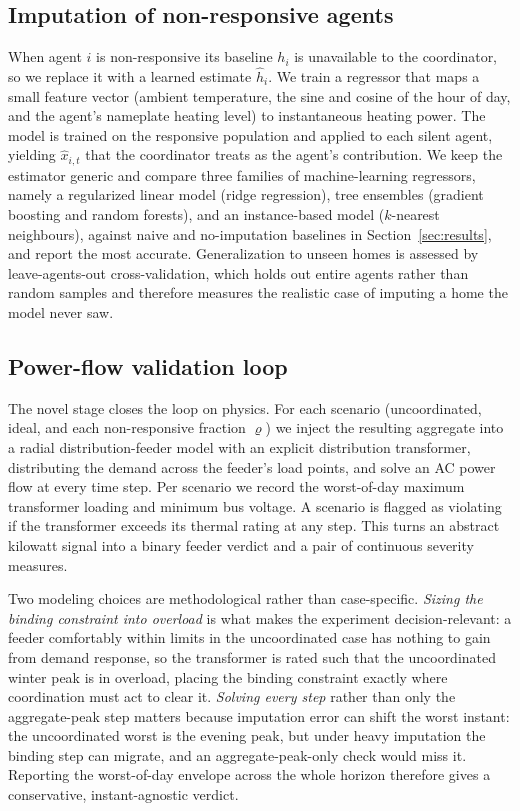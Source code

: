 \subsection{Imputation of non-responsive agents}
When agent $i$ is non-responsive its baseline $h_i$ is unavailable to the
coordinator, so we replace it with a learned estimate $\hat{h}_i$. We train a
regressor that maps a small feature vector (ambient temperature, the sine and
cosine of the hour of day, and the agent's nameplate heating level) to
instantaneous heating power. The model is trained on the responsive population
and applied to each silent agent, yielding $\hat{x}_{i,t}$ that the coordinator
treats as the agent's contribution. We keep the estimator generic and compare
three families of machine-learning regressors, namely a regularized linear model
(ridge regression), tree ensembles (gradient boosting \cite{ke2017lightgbm} and
random forests), and an instance-based model ($k$-nearest neighbours), against
naive and no-imputation baselines in Section~\ref{sec:results}, and report the
most accurate. Generalization to unseen homes is assessed
by leave-agents-out cross-validation, which holds out entire agents rather than
random samples and therefore measures the realistic case of imputing a home the
model never saw.

\subsection{Power-flow validation loop}
The novel stage closes the loop on physics. For each scenario (uncoordinated,
ideal, and each non-responsive fraction $\varrho$) we inject the resulting
aggregate into a radial distribution-feeder model with an explicit distribution
transformer, distributing the demand across the feeder's load points, and solve
an AC power flow at every time step. Per scenario we record the worst-of-day
maximum transformer loading and minimum bus voltage. A scenario is flagged as
violating if the transformer exceeds its thermal rating at any step. This turns
an abstract kilowatt signal into a binary feeder verdict and a pair of continuous
severity measures.

Two modeling choices are methodological rather than case-specific. \emph{Sizing
the binding constraint into overload} is what makes the experiment
decision-relevant: a feeder comfortably within limits in the uncoordinated case
has nothing to gain from demand response, so the transformer is rated such that
the uncoordinated winter peak is in overload, placing the binding constraint
exactly where coordination must act to clear it. \emph{Solving every step} rather
than only the aggregate-peak step matters because imputation error can shift the
worst instant: the uncoordinated worst is the evening peak, but under heavy
imputation the binding step can migrate, and an aggregate-peak-only check would
miss it. Reporting the worst-of-day envelope across the whole horizon therefore
gives a conservative, instant-agnostic verdict.

